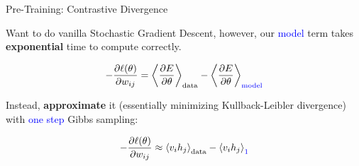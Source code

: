 \documentclass[notes]{beamer}
\newcommand{\partialDx}[2]{\frac{\partial #1}{ \partial #2  }}
\newcommand{\inAngle}[1]{\left \langle #1 \right \rangle}
\begin{document}
\begin{frame}{Pre-Training: Contrastive Divergence}
		\begin{center}
			Want to do vanilla Stochastic Gradient Descent, however, our \textcolor{blue}{model} term takes \textbf{exponential} time to compute correctly. 
		\end{center}
		
		\begin{equation*}
			- \partialDx{\ell(\theta)}{w_{ij}} = \inAngle{ \partialDx{E}{\theta} }_\text{data} - \inAngle{ \partialDx{E}{\theta} }_\text{\textcolor{blue}{model}}
		\end{equation*}
		
		\begin{center}
			Instead, \textbf{approximate} it (essentially minimizing Kullback-Leibler divergence) with \textcolor{blue}{one step} Gibbs sampling:
		\end{center}
		
		\begin{equation*}
			- \partialDx{\ell(\theta)}{w_{ij}} \approx \inAngle{ v_i h_j }_\text{data} - \inAngle{ v_i h_j }_\text{\textcolor{blue}{1}}
		\end{equation*}
\end{frame}
\end{document}
